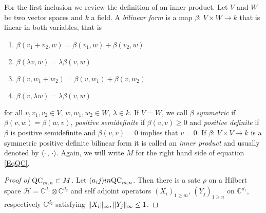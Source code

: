 For the first inclusion we review the definition of an inner product. 
Let $ V $ and $ W $ be two vector spaces and $ k  $ a field. A {\itshape bilinear form} is a map $ \beta: \, V \times W \to k $ that is linear in both variables, that is 
\begin{enumerate}
	\item $\beta(v_1+v_2,w) = \beta(v_1,w) + \beta(v_2,w)  $
	\item  $\beta(\lambda v,w)= \lambda \beta(v,w) $
	\item $ \beta(v,w_1+w_2) = \beta(v,w_1)+ \beta(v,w_2) $
	\item $ \beta(v,\lambda w) = \lambda\beta(v,w) $
\end{enumerate}
for all $ v,v_1,v_2 \in V, \, w,w_1,w_2 \in W, \, \lambda \in k $. 
If $ V = W $, we call $ \beta $ {\itshape symmetric} if $ \beta(v,w) = \beta(w,v) $, {\itshape positive semidefinite} if 
$ \beta(v,v) \ge 0 $ and {\itshape positive definite} if $ \beta $ is positive semidefinite and $ \beta(v,v)= 0 $ implies that $ v = 0 $. 
If $ \beta: \, V \times V \to k $ is a symmetric positive definite bilinear form it is called an {\itshape inner product} and usually denoted by $ \langle \cdot \, , \, \cdot \rangle $.
Again, we will write $ M $ for the right hand side of equation \ref{EqQC}.
\begin{proof}[Proof of $ \textup{QC}_{m,n} \subset M $]
	Let $ (a_ij) in \textup{QC}_{m,n} $. Then there is a sate $ \rho $ on a Hilbert space $ \mathcal{H} = \mathbb{C}^{d_1} \otimes\mathbb{C}^{d_2} $ and self adjoint operators $ (X_i)_{1 \ge m}, \, (Y_j)_{1 \ge n} $ on $ \mathbb{C}^{d_1} $, respectively $ \mathbb{C}^{d_2} $ satisfying $  \Vert {X_i} \Vert_{\infty},  \Vert {Y_j} \Vert_{\infty} \le 1 $.
\end{proof}